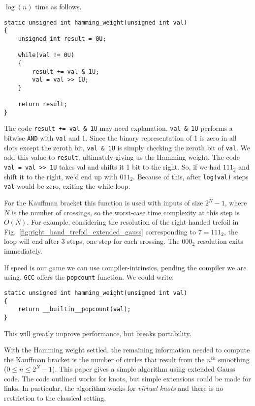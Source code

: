 \documentclass{article}
\theoremstyle{plain}
\begin{document}
        $\log(n)$ time as follows.
        \newpage
\begin{lstlisting}[style=CStyle]
static unsigned int hamming_weight(unsigned int val)
{
    unsigned int result = 0U;

    while(val != 0U)
    {
        result += val & 1U;
        val = val >> 1U;
    }

    return result;
}
\end{lstlisting}
        The code \texttt{result += val \& 1U} may need explanation.
        \texttt{val \& 1U} performs a bitwise \texttt{AND} with \texttt{val} and
        1. Since the binary representation of 1 is zero in all slots except the
        zeroth bit, \texttt{val \& 1U} is simply checking the zeroth bit of
        \texttt{val}. We add this value to \texttt{result}, ultimately giving
        us the Hamming weight. The code \texttt{val = val >> 1U} takes val and
        shifts it 1 bit to the right. So, if we had $111_{2}$ and shift it to
        the right, we'd end up with $011_{2}$. Because of this, after
        \texttt{log(val)} steps \texttt{val} would be zero, exiting the
        while-loop.
        \par\hfill\par
        For the Kauffman bracket this function is used with inputs of size
        $2^{N}-1$, where $N$ is the number of crossings, so the worst-case
        time complexity at this step is $O(N)$. For example, considering the
        resolution of the right-handed trefoil
        in Fig.~\ref{fig:right_hand_trefoil_extended_gauss} corresponding to
        $7=111_{2}$, the loop will end after 3 steps, one step for each
        crossing. The $000_{2}$ resolution exits immediately.
        \par\hfill\par
        If speed is our game we can use compiler-intrinsics, pending the
        compiler we are using. \texttt{GCC} offers the \texttt{popcount}
        function. We could write:
\begin{lstlisting}[style=CStyle]
static unsigned int hamming_weight(unsigned int val)
{
    return __builtin__popcount(val);
}
\end{lstlisting}
        This will greatly improve performance, but breaks portability.
        \par\hfill\par
        With the Hamming weight settled, the remaining information needed to
        compute the Kauffman bracket is the number of circles that result from
        the $n^{th}$ smoothing ($0\leq{n}\leq{2}^{N}-1$). This paper gives a
        simple algorithm using extended Gauss code. The code outlined works for
        knots, but simple extensions could be made for links. In particular, the
        algorithm works for \textit{virtual knots} and there is no restriction
        to the classical setting.
\end{document}
